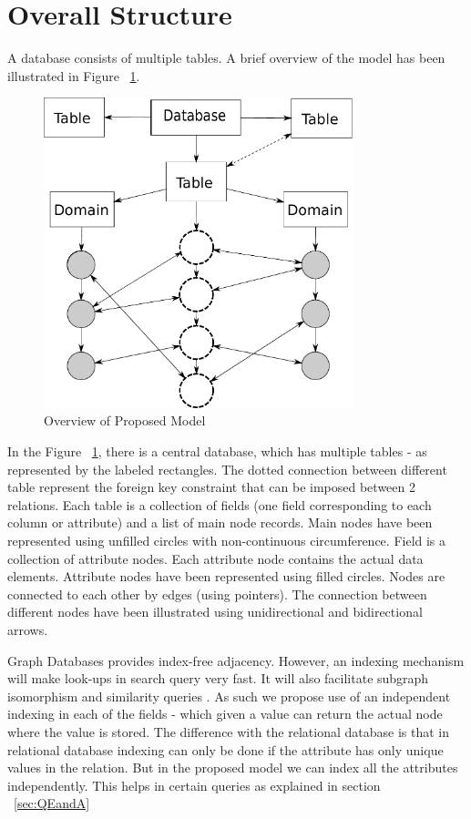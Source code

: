\documentclass[12pt, oneside]{book}
\begin{document}
\section{Overall Structure}
A database consists of multiple tables. A brief overview of the model has been illustrated in Figure ~\ref{fig:overview}. \\
\begin{figure}[t]
 \centering
 \includegraphics[width=0.8\textwidth]{pics/model.pdf}
 \caption{Overview of Proposed Model}
 \label{fig:overview}
\end{figure}
In the Figure ~\ref{fig:overview}, there is a central database, which has multiple tables - as represented by the labeled rectangles. The dotted connection between different table represent the foreign key constraint that can be imposed between 2 relations. Each table is a collection of fields (one field corresponding to each column or attribute) and a list of main node records. Main nodes have been represented using unfilled circles with non-continuous circumference. Field is a collection of attribute nodes. Each attribute node contains the actual data elements. Attribute nodes have been represented using filled circles. Nodes are connected to each other by edges (using pointers). The connection between different nodes have been illustrated using unidirectional and bidirectional arrows. \\ \par
Graph Databases provides index-free adjacency. However, an indexing mechanism will make look-ups in search query very fast. It will also facilitate subgraph isomorphism and similarity queries \cite{indexing}. As such we propose use of an independent indexing in each of the fields - which given a value can return the actual node where the value is stored. The difference with the relational database is that in relational database indexing can only be done if the attribute has only unique values in the relation. But in the proposed model we can index all the attributes independently. This helps in certain queries as explained in section ~\ref{sec:QEandA}
\end{document}
